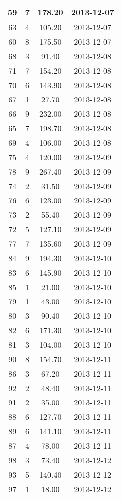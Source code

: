 \documentclass[a4paper,10pt]{report}
\begin{document}
\begin{longtable}{|c|c|c|c|}
59 &  7 &178.20 &2013-12-07\\ \hline
63 &  4 &105.20 &2013-12-07\\ \hline
60 &  8 &175.50 &2013-12-07\\ \hline
68 &  3 & 91.40 &2013-12-08\\ \hline
71 &  7 &154.20 &2013-12-08\\ \hline
70 &  6 &143.90 &2013-12-08\\ \hline
67 &  1 & 27.70 &2013-12-08\\ \hline
66 &  9 &232.00 &2013-12-08\\ \hline
65 &  7 &198.70 &2013-12-08\\ \hline
69 &  4 &106.00 &2013-12-08\\ \hline
75 &  4 &120.00 &2013-12-09\\ \hline
78 &  9 &267.40 &2013-12-09\\ \hline
74 &  2 & 31.50 &2013-12-09\\ \hline
76 &  6 &123.00 &2013-12-09\\ \hline
73 &  2 & 55.40 &2013-12-09\\ \hline
72 &  5 &127.10 &2013-12-09\\ \hline
77 &  7 &135.60 &2013-12-09\\ \hline
84 &  9 &194.30 &2013-12-10\\ \hline
83 &  6 &145.90 &2013-12-10\\ \hline
85 &  1 & 21.00 &2013-12-10\\ \hline
79 &  1 & 43.00 &2013-12-10\\ \hline
80 &  3 & 90.40 &2013-12-10\\ \hline
82 &  6 &171.30 &2013-12-10\\ \hline
81 &  3 &104.00 &2013-12-10\\ \hline
90 &  8 &154.70 &2013-12-11\\ \hline
86 &  3 & 67.20 &2013-12-11\\ \hline
92 &  2 & 48.40 &2013-12-11\\ \hline
91 &  2 & 35.00 &2013-12-11\\ \hline
88 &  6 &127.70 &2013-12-11\\ \hline
89 &  6 &141.10 &2013-12-11\\ \hline
87 &  4 & 78.00 &2013-12-11\\ \hline
98 &  3 & 73.40 &2013-12-12\\ \hline
93 &  5 &140.40 &2013-12-12\\ \hline
97 &  1 & 18.00 &2013-12-12\\ \hline

\end{longtable}
\end{document}
